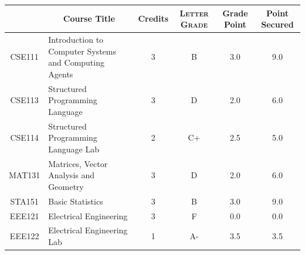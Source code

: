\documentclass[11pt]{article}
\newcommand*{\numtwo}[1]{\pgfmathprintnumber[
                    fixed, precision=2, fixed zerofill=true]{#1}}
\begin{document}
                \begin{center}
                    \renewcommand{\arraystretch}{1.08}
                    
                \begin{tabular}{|c|l|c|>{\scshape}c|c|c|}
                \hline  \rule[-1ex]{0pt}{3.5ex} {\centering{\bf Course Code}} &  \multicolumn{1}{c|}{\textbf{Course Title}}  & {\bf Credits} & {\bf Letter Grade} & {\bf Grade Point} & {\bf Point Secured}  \\ 
                \hline   CSE111 &  Introduction to Computer Systems and Computing Agents		 & 3 & B & 3.0 & 9.0 \\ %
                \hline   CSE113 &  Structured Programming Language		 & 3 & D & 2.0 & 6.0 \\ %
                \hline   CSE114 &  Structured Programming Language Lab		 & 2 & C+ & 2.5 & 5.0 \\ %
                \hline   MAT131 &  Matrices, Vector Analysis and Geometry		 & 3 & D & 2.0 & 6.0 \\ %
                \hline   STA151 &  Basic Statistics		 & 3 & B & 3.0 & 9.0 \\ %
                \hline   EEE121 &  Electrical Engineering		 & 3 & F & 0.0 & 0.0 \\ %
                \hline   EEE122 &  Electrical Engineering Lab		 & 1 & A- & 3.5 & 3.5 \\ %

\hline                %
                \end{tabular}
                \end{center}
                \renewcommand{\arraystretch}{1.03}
\end{document}

